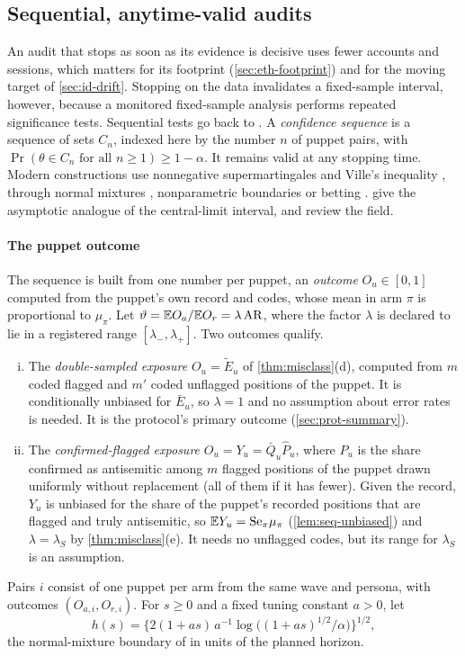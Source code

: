 \subsection{Sequential, anytime-valid audits}\label{sec:meas-sequential}

An audit that stops as soon as its evidence is decisive uses fewer accounts and sessions, which matters for its footprint (\cref{sec:eth-footprint}) and for the moving target of \cref{sec:id-drift}. Stopping on the data invalidates a fixed-sample interval, however, because a monitored fixed-sample analysis performs repeated significance tests. Sequential tests go back to \citet{wald1945}. A \emph{confidence sequence} \citep{darling1967} is a sequence of sets $C_n$, indexed here by the number $n$ of puppet pairs, with $\Pr(\theta\in C_n\text{ for all }n\ge1)\ge1-\alpha$. It remains valid at any stopping time. Modern constructions use nonnegative supermartingales and Ville's inequality \citep{ville1939}, through normal mixtures \citep{robbins1970}, nonparametric boundaries \citep{howard2021} or betting \citep{waudbysmith2024betting}. \citet{waudbysmith2024asymp} give the asymptotic analogue of the central-limit interval, and \citet{ramdas2023} review the field.

\paragraph{The puppet outcome}
The sequence is built from one number per puppet, an \emph{outcome} $O_u\in[0,1]$ computed from the puppet's own record and codes, whose mean in arm $\pi$ is proportional to $\mu_\pi$. Let $\vartheta=\mathbb{E} O_a/\mathbb{E} O_r=\lambda\,\mathrm{AR}$, where the factor $\lambda$ is declared to lie in a registered range $[\lambda_-,\lambda_+]$. Two outcomes qualify.
\begin{enumerate}[(i)]
  \item The \emph{double-sampled exposure} $O_u=\widetilde E_u$ of \cref{thm:misclass}(d), computed from $m$ coded flagged and $m'$ coded unflagged positions of the puppet. It is conditionally unbiased for $\bar E_u$, so $\lambda=1$ and no assumption about error rates is needed. It is the protocol's primary outcome (\cref{sec:prot-summary}).
  \item The \emph{confirmed-flagged exposure} $O_u=Y_u=\bar Q_u\widehat P_u$, where $\widehat P_u$ is the share confirmed as antisemitic among $m$ flagged positions of the puppet drawn uniformly without replacement (all of them if it has fewer). Given the record, $Y_u$ is unbiased for the share of the puppet's recorded positions that are flagged and truly antisemitic, so $\mathbb{E} Y_u=\mathrm{Se}_\pi\mu_\pi$ (\cref{lem:seq-unbiased}) and $\lambda=\lambda_S$ by \cref{thm:misclass}(e). It needs no unflagged codes, but its range for $\lambda_S$ is an assumption.
\end{enumerate}
Pairs $i$ consist of one puppet per arm from the same wave and persona, with outcomes $(O_{a,i},O_{r,i})$. For $s\ge0$ and a fixed tuning constant $a>0$, let
\[
  h(s)=\bigl\{2(1+as)\,a^{-1}\log\bigl((1+as)^{1/2}/\alpha\bigr)\bigr\}^{1/2},
\]
the normal-mixture boundary of \citet{robbins1970} in units of the planned horizon.

